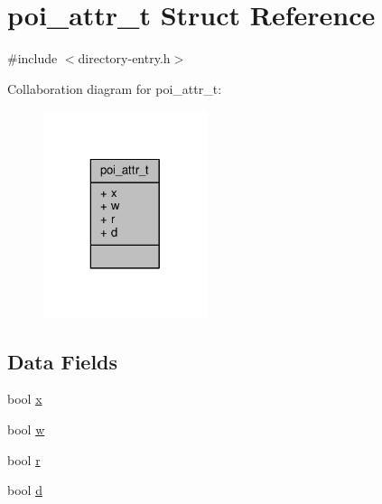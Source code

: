 \hypertarget{structpoi__attr__t}{\section{poi\-\_\-attr\-\_\-t Struct Reference}
\label{structpoi__attr__t}
}


{\ttfamily \#include $<$directory-\/entry.\-h$>$}



Collaboration diagram for poi\-\_\-attr\-\_\-t\-:\nopagebreak
\begin{figure}[H]
\begin{center}
\leavevmode
\includegraphics[width=136pt]{structpoi__attr__t__coll__graph}
\end{center}
\end{figure}
\subsection*{Data Fields}
\begin{DoxyCompactItemize}
\item 
bool \hyperlink{structpoi__attr__t_a946a8f8377210c472c7cbdf11f154280}{x}
\item 
bool \hyperlink{structpoi__attr__t_ac2e5f3b10af22c39ed83be143a508b80}{w}
\item 
bool \hyperlink{structpoi__attr__t_a904fc9328a7095487716875e4a892851}{r}
\item 
bool \hyperlink{structpoi__attr__t_a291ac6e121c27d3c9a71d995cf34685c}{d}
\end{DoxyCompactItemize}


